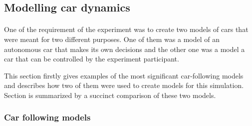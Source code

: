\documentclass[11pt,english,twoside]{article}
\begin{document}















\subsection{Modelling car dynamics}
\paragraph{}
One of the requirement of the experiment was to create two models of cars that were meant for two different purposes. One of them was a model of an autonomous car that makes its own decisions and the other one was a model a car that can be controlled by the experiment participant. 

\par
This section firstly gives examples of the most significant car-following models and describes how two of them were used to create models for this simulation. Section is summarized by a succinct comparison of these two models.



\subsubsection{Car following models}
\end{document}
